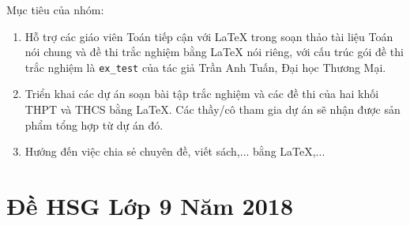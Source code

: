 \documentclass[12pt,a4paper,oneside]{book}
\theoremstyle{nonumberplain}
\numberwithin{equation}{section}
\begin{document}
	\noindent Mục tiêu của nhóm: 
	\begin{enumerate}
		\item Hỗ trợ các giáo viên Toán tiếp cận với \LaTeX{} trong soạn thảo tài liệu Toán nói chung và đề thi trắc nghiệm bằng \LaTeX{} nói riêng, với cấu trúc gói đề thi trắc nghiệm là \texttt{ex\_test} của tác giả Trần Anh Tuấn, Đại học Thương Mại.
		\item Triển khai các dự án soạn bài tập trắc nghiệm và các đề thi của hai khối THPT và THCS bằng \LaTeX{}. Các thầy/cô tham gia dự án sẽ nhận được sản phẩm tổng hợp từ dự án đó.
		\item Hướng đến việc chia sẻ chuyên đề, viết sách,... bằng \LaTeX,...
	\end{enumerate}
	\chapter{Đề HSG Lớp 9 Năm 2018}
	
	\newpage
	\newpage
	\newpage
	\newpage
	\newpage
	\newpage
	\newpage
	\newpage
	\newpage
	\newpage
	\newpage
	\newpage
	\newpage
	\newpage
	\newpage
	\newpage
	\newpage
	\newpage
	\newpage
	\newpage
	\newpage
	\newpage
	\newpage
	\newpage
	\newpage
	\newpage
	\newpage
	\newpage
	\newpage
	\newpage
	\newpage
	\newpage
	\newpage
	\newpage
	\newpage
	\newpage
	\newpage
	\newpage
\end{document}

